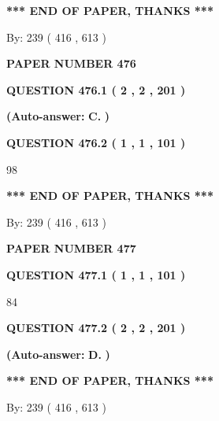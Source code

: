 \documentclass{ctexart}
\begin{document}
 
   
   
   
   
\vspace{1.0in} 
{\textbf{\large{ *** END OF PAPER, THANKS *** }}} 
   
   
\hspace{1.0in} By: 
 239 ( 416 ,  613 )
   
   
   
   
\newpage 
\setcounter{page}{ 
   476001 } 
   
   
 {\textbf{ \Large{ PAPER NUMBER  476  }}}
   
   
   
   
  
  
{\textbf{\large{QUESTION
476.1 
 ( 2 , 2 , 201 )
}}}
 
 
{\textbf{(Auto-answer:}}
{\textbf{\large{
C.}}}
{\textbf{)}}
 
 
  
  
{\textbf{\large{QUESTION
476.2 
 ( 1 , 1 , 101 )
}}}

98
   
   
   
   
\vspace{1.0in} 
{\textbf{\large{ *** END OF PAPER, THANKS *** }}} 
   
   
\hspace{1.0in} By: 
 239 ( 416 ,  613 )
   
   
   
   
\newpage 
\setcounter{page}{ 
   477001 } 
   
   
 {\textbf{ \Large{ PAPER NUMBER  477  }}}
   
   
   
   
  
  
{\textbf{\large{QUESTION
477.1 
 ( 1 , 1 , 101 )
}}}

84
  
  
{\textbf{\large{QUESTION
477.2 
 ( 2 , 2 , 201 )
}}}
 
 
{\textbf{(Auto-answer:}}
{\textbf{\large{
D.}}}
{\textbf{)}}
 
 
   
   
   
   
\vspace{1.0in} 
{\textbf{\large{ *** END OF PAPER, THANKS *** }}} 
   
   
\hspace{1.0in} By: 
 239 ( 416 ,  613 )
   
   
   
   
\newpage 
\setcounter{page}{ 
   478001 } 
   
\end{document}
